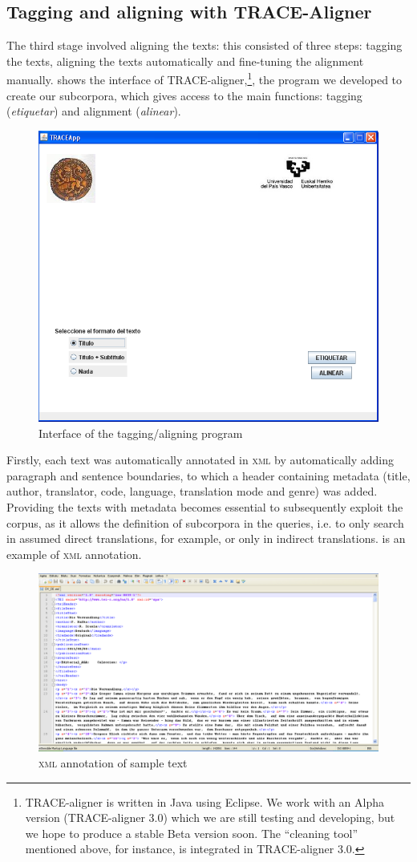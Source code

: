 \documentclass[output=paper]{LSP/langsci}
\begin{document}
\subsection{Tagging and aligning with TRACE-Aligner}

The third stage involved aligning the texts: this consisted of three steps: tagging the texts, aligning the texts automatically and fine-tuning the alignment manually.  shows the interface of TRACE-aligner,\footnote{TRACE-aligner is written in Java using Eclipse. We work with an Alpha version (TRACE-aligner 3.0) which we are still testing and developing, but we hope to produce a stable Beta version soon. The “cleaning tool” mentioned above, for instance, is integrated in TRACE-aligner 3.0.}, the program we developed to create our subcorpora, which gives access to the main functions: tagging (\textit{etiquetar}) and alignment (\textit{alinear}).  

\begin{figure} 
\includegraphics[width=.5\textwidth]{./figures/6-1.png}
\caption{Interface of the tagging/aligning program} \label{fig:3:1}
\end{figure}

Firstly, each text was automatically annotated in \textsc{xml} by automatically adding paragraph and sentence boundaries, to which a header containing metadata (title, author, translator, code, language, translation mode and genre) was added. Providing the texts with metadata becomes essential to subsequently exploit the corpus, as it allows the definition of subcorpora in the queries, i.e. to only search in assumed direct translations, for example, or only in indirect translations.  is an example of \textsc{xml} annotation.

\begin{figure}
\includegraphics[width=1.0\textwidth]{./figures/6-2.png}
\caption{\textsc{xml} annotation of sample text} \label{fig:3:2}
\end{figure}
\end{document}
